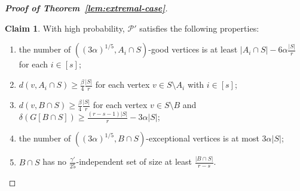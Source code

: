 \documentclass[11pt, a4paper]{article}
\theoremstyle{definition}
\newtheorem{claim}[theorem]{Claim}
\newcommand{\<}{\subseteq}
\newcommand{\de}{\delta}
\begin{document}
\begin{proof}[{\bf Proof of Theorem~\ref{lem:extremal-case}}]
\begin{claim}\label{claim-prob}
With high probability, $\mathcal{P}'$ satisfies the following properties:
\begin{enumerate}[label=\rmfamily (A\arabic*), start=3]
    \item\label{D1} the number of $((3\alpha)^{1/5},A_i\cap S)$-good vertices is at least $|A_i\cap S|-{6\alpha \frac{|S|}{r}}$ for each $i\in [s]$; 
    \item\label{D3} $d(v,A_i\cap S)\geq {\frac{\beta}{4}\frac{|S|}{r}}$ for each vertex $v\in S\setminus A_i$ with $i\in [s]$;
    \item\label{D4} $d(v,B\cap S)\geq {\frac{\beta}{4}\frac{|S|}{r}}$ for each vertex $v\in S\setminus B$ and $\de(G[B\cap S])\ge {\frac{(r-s-1)|S|}{r}-3\alpha |S|}$;
    \item\label{D5} the number of $((3\alpha)^{1/5},B\cap S)$-exceptional vertices is at most ${3\alpha |S|}$;
    \item\label{D7} %
    $B\cap S$ has no $\frac{\gamma'}{25}$-independent set of size  at least $\frac{|B\cap S|}{r-s}$.
\end{enumerate}
\end{claim}


\end{proof}
\end{document}
